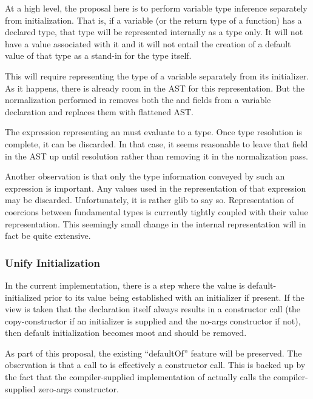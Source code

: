 At a high level, the proposal here is to perform variable type inference separately from
initialization.  That is, if a variable (or the return type of a function) has a declared type, that type will be represented internally as a type only.  It
will not have a value associated with it and it will not entail the creation of a default
value of that type as a stand-in for the type itself.

This will require representing the type of a variable separately from its
initializer.  As it happens, there is already room in the AST for this representation.
But the normalization performed in  removes both the 
and  fields from a variable declaration and replaces them with flattened AST.

The expression representing an  must evaluate to a type.  Once type
resolution is complete, it can be discarded.  In that case, it seems reasonable to leave
that field in the AST up until resolution rather than removing it in the normalization
pass.

Another observation is that only the type information conveyed by such an expression is
important.  Any values used in the representation of that expression may be discarded.
Unfortunately, it is rather glib to say so.  Representation of coercions between
fundamental types is currently tightly coupled with their value representation.  This
seemingly small change in the internal representation will in fact be quite extensive.

\subsubsection{Unify Initialization}

In the current implementation, there is a step where the value is default-initialized
prior to its value being established with an initializer if present.  If the view is taken
that the declaration itself always results in a constructor call (the copy-constructor if
an initializer is supplied and the no-args constructor if not), then default
initialization becomes moot and should be removed.

As part of this proposal, the existing ``defaultOf'' feature will be preserved.  The
observation is that a call to  is effectively a constructor call.  This
is backed up by the fact that the compiler-supplied implementation of 
actually calls the compiler-supplied zero-args constructor.  

